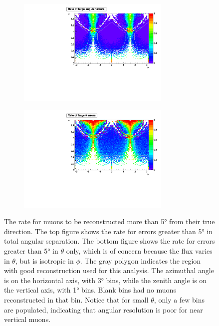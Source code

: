 \documentclass[herrin-thesis.tex]{subfiles}
\begin{document}
 \begin{figure}[htpb]
 \centering
 \begin{subfigure}[b]{1.0\textwidth}
 \centering
 \includegraphics[width=0.8\textwidth]{./plots/muon_misrecon_ang_rate.pdf}
 \end{subfigure}
  \begin{subfigure}[b]{1.0\textwidth}
  \centering
   \includegraphics[width=0.8\textwidth]{./plots/muon_misrecon_theta_rate.pdf}
  \end{subfigure}
 \caption[Rate of poorly reconstructed muons]{The rate for muons to be reconstructed more than \ang{5} from their true direction. The top figure shows the rate for  errors greater than \ang{5} in total angular separation. The bottom figure shows the rate for errors greater than \ang{5} in \(\theta\) only, which is of concern because the flux varies in \(\theta\), but is isotropic in \(\phi\). The gray polygon indicates the region with good reconstruction used for this analysis. The azimuthal angle is on the horizontal axis, with \ang{3} bins, while the zenith angle is on the vertical axis, with \ang{1} bins. Blank bins had no muons reconstructed in that bin. Notice that for small \(\theta\), only a few bins are populated, indicating that angular resolution is poor for near vertical muons.}
 \label{fig:muon_misrecon_rate}
 \end{figure}
\end{document}
